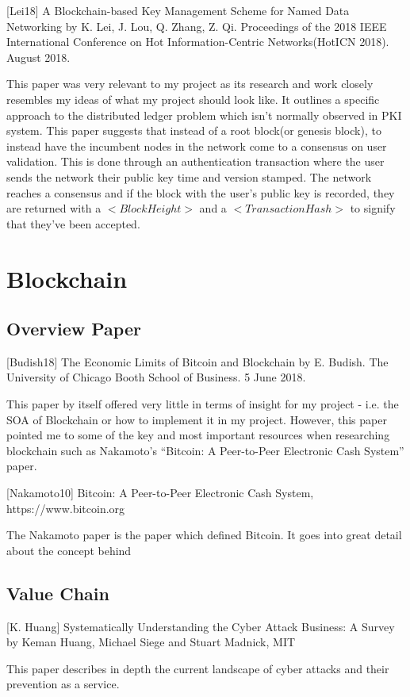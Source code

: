 [Lei18] A Blockchain-based Key Management Scheme for Named Data Networking by K. Lei, J. Lou, Q. Zhang, Z. Qi. Proceedings of the  2018 IEEE International Conference on Hot Information-Centric Networks(HotICN 2018). August 2018.

This paper was very relevant to my project as its research and work closely resembles my ideas of what my project should look like. It outlines a specific approach to the distributed ledger problem which isn't normally observed in PKI system. This paper suggests that instead of a root block(or genesis block), to instead have the incumbent nodes in the network come to a consensus on user validation. This is done through an authentication transaction where the user sends the network their public key time and version stamped. The network reaches a consensus and if the block with the user's public key is recorded, they are returned with a ${<}Block Height{>}$ and a ${<}Transaction Hash{>}$ to signify that they've been accepted.


\section{Blockchain}
\subsection{Overview Paper}
[Budish18]  The Economic Limits of Bitcoin and Blockchain by E. Budish. The University of Chicago Booth School of Business. 5 June 2018.


This paper by itself offered very little in terms of insight for my project - i.e. the SOA of Blockchain or how to implement it in my project. However, this paper pointed me to some of the key and most important resources when researching blockchain such as Nakamoto’s “Bitcoin: A Peer-to-Peer Electronic Cash System” paper. 

[Nakamoto10] Bitcoin: A Peer-to-Peer Electronic Cash System, https://www.bitcoin.org

The Nakamoto paper is the paper which defined Bitcoin. It goes into great detail about the concept behind 

\subsection{Value Chain}
[K. Huang] Systematically Understanding the Cyber Attack Business: A Survey by Keman Huang, Michael Siege and Stuart Madnick, MIT 

This paper describes in depth the current landscape of cyber attacks and their prevention as a service. 


